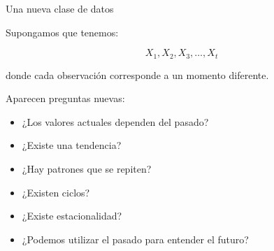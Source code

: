 \documentclass[aspectratio=169,11pt]{beamer}
\begin{document}

\begin{frame}{Una nueva clase de datos}

Supongamos que tenemos:

\[
X_1,
X_2,
X_3,
\ldots,
X_t
\]

donde cada observación corresponde a un momento diferente.

\vspace{0.4cm}

Aparecen preguntas nuevas:

\begin{itemize}

    \item ¿Los valores actuales dependen del pasado?

    \item ¿Existe una tendencia?

    \item ¿Hay patrones que se repiten?

    \item ¿Existen ciclos?

    \item ¿Existe estacionalidad?

    \item ¿Podemos utilizar el pasado para entender el futuro?

\end{itemize}

\end{frame}

\end{document}
